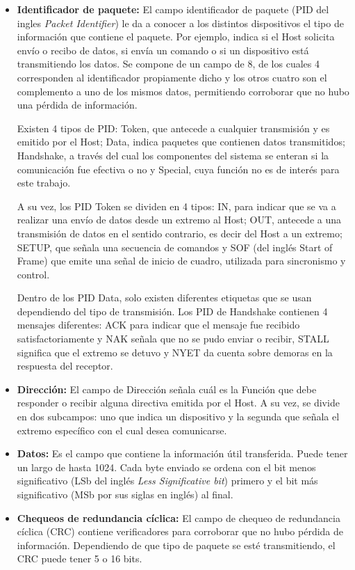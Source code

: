 	\begin{itemize}

	\item {\bf Identificador de paquete:}
		El campo identificador de paquete (PID del ingles {\it Packet Identifier}) le da a conocer a los distintos dispositivos el tipo de información que contiene el paquete. Por ejemplo, indica si el Host solicita envío o recibo de datos, si envía un comando o si un dispositivo está transmitiendo los datos. Se compone de un campo de \SI{8}{\bit}, de los cuales 4 corresponden al identificador propiamente dicho y los otros cuatro son el complemento a uno de los mismos datos, permitiendo corroborar que no hubo una pérdida de información.%
		
		Existen 4 tipos de PID: Token, que antecede a cualquier transmisión y es emitido por el Host; Data, indica paquetes que contienen datos transmitidos; Handshake, a través del cual los componentes del sistema se enteran si la comunicación fue efectiva o no y Special, cuya función no es de interés para este trabajo.%
	
		A su vez, los PID Token se dividen en 4 tipos: IN, para indicar que se va a realizar una envío de datos desde un extremo al Host; OUT, antecede a una transmisión de datos en el sentido contrario, es decir del Host a un extremo; SETUP, que señala una secuencia de comandos y SOF (del inglés {Start of Frame)} que emite una señal de inicio de cuadro, utilizada para sincronismo y control.%
	
		Dentro de los PID Data, solo existen diferentes etiquetas que se usan dependiendo del tipo de transmisión. Los PID de Handshake contienen 4 mensajes diferentes: ACK para indicar que el mensaje fue recibido satisfactoriamente y NAK señala que no se pudo enviar o recibir, STALL significa que el extremo se detuvo y NYET da cuenta sobre demoras en la respuesta del receptor.
	
	\item{\bf Dirección:}
		El campo de Dirección señala cuál es la Función que debe responder o recibir alguna directiva emitida por el Host. A su vez, se divide en dos subcampos: uno que indica un dispositivo y la segunda que señala el extremo específico con el cual desea comunicarse.

	\item{\bf Datos:}
		Es el campo que contiene la información útil transferida. Puede tener un largo de hasta \SI{1024}{\byte}. Cada byte enviado se ordena con el bit menos significativo (LSb del inglés {\it Less Significative bit}) primero y el bit más significativo (MSb por sus siglas en inglés) al final.

	\item{\bf Chequeos de redundancia cíclica:}
		El campo de chequeo de redundancia cíclica (CRC) contiene verificadores para corroborar que no hubo pérdida de información. Dependiendo de que tipo de paquete se esté transmitiendo, el CRC puede tener 5 o 16 bits. 
	\end{itemize}
